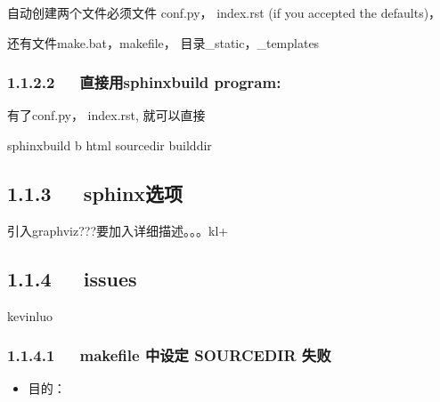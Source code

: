 \documentclass[letterpaper,12pt,english]{sphinxmanual}
\begin{document}
自动创建两个文件必须文件
conf.py， index.rst (if you accepted the defaults)，

还有文件make.bat，makefile， 目录\_static，\_templates


\subsubsection{1.1.2.2   直接用sphinx\sphinxhyphen{}build program:}
\label{\detokenize{001software/001install/sphinx:sphinx-build-program}}
有了conf.py， index.rst, 就可以直接

\begin{sphinxVerbatim}[commandchars=\\\{\}]
\PYGZdl{} sphinx\PYGZhy{}build \PYGZhy{}b html sourcedir builddir
\end{sphinxVerbatim}


\subsection{1.1.3   sphinx选项}
\label{\detokenize{001software/001install/sphinx:id3}}
引入graphviz???要加入详细描述。。。kl+



\subsection{1.1.4   issues}
\label{\detokenize{001software/001install/sphinx:issues}}
kevinluo


\subsubsection{1.1.4.1   makefile 中设定 SOURCEDIR 失败}
\label{\detokenize{001software/001install/sphinx:makefile-sourcedir}}\begin{itemize}
\item {} 
目的：

\end{itemize}
\end{document}
